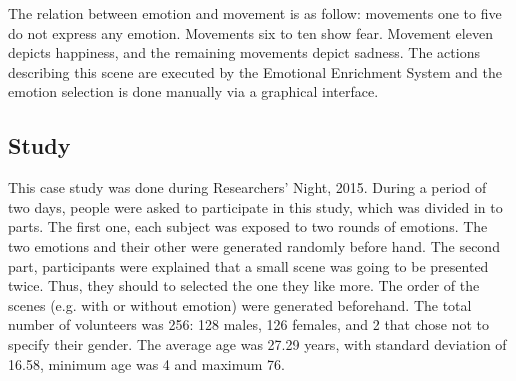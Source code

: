 The relation between emotion and movement is as follow: movements one to five do not express any emotion. Movements six to ten show fear. Movement eleven depicts happiness, and the remaining movements depict sadness. The actions describing this scene are executed by the Emotional Enrichment System and the emotion selection is done manually via a graphical interface.

\subsection{Study}

This case study was done during Researchers' Night, 2015. During a period of two days, people were asked to participate in this study, which was divided in to parts. The first one, each subject was exposed to two rounds of emotions. The two emotions and their other were generated randomly before hand. The second part, participants were explained that a small scene was going to be presented twice. Thus, they should to selected the one they like more. The order of the scenes (e.g. with or without emotion) were generated beforehand. The total number of volunteers was 256: 128 males, 126 females, and 2 that chose not to specify their gender. The average age was 27.29 years, with standard deviation of 16.58, minimum age was 4 and maximum 76.
